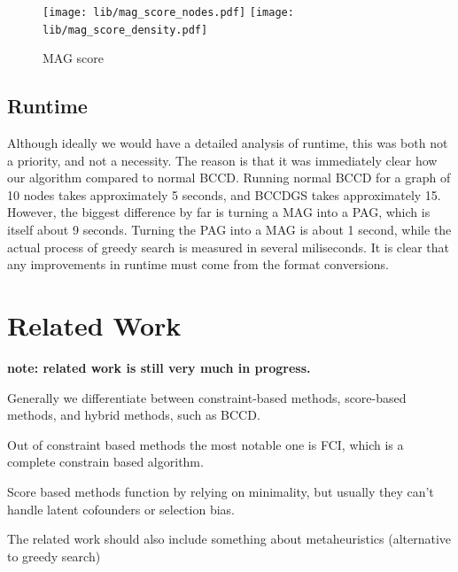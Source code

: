 \documentclass[11pt,a4paper]{report}
\theoremstyle{definition}
\begin{document}
\begin{figure}
  \centering
  \texttt{[image: lib/mag\_score\_nodes.pdf]}
  \texttt{[image: lib/mag\_score\_density.pdf]}
  \caption{MAG score}
  \label{fig:mag_score}
\end{figure}

\section{Runtime}\label{runtime}
Although ideally we would have a detailed analysis of runtime, this was
both not a priority, and not a necessity. The reason is that it was
immediately clear how our algorithm compared to normal BCCD. Running
normal BCCD for a graph of 10 nodes takes approximately 5 seconds, and
BCCDGS takes approximately 15. However, the biggest difference by far is
turning a MAG into a PAG, which is itself about 9 seconds. Turning the PAG
into a MAG is about 1 second, while the actual process of greedy search is
measured in several miliseconds. It is clear that any improvements in
runtime must come from the format conversions.

\chapter{Related Work}\label{relatedwork}

\textbf{note: related work is still very much in progress.}

Generally we differentiate between constraint-based methods, score-based
methods, and hybrid methods, such as BCCD.

Out of constraint based methods the most notable one is
FCI\cite{spirtesCausationPredictionSearch2000}, which is a complete
\cite{zhangCompletenessOrientationRules2008} constrain based algorithm.

Score based methods function by relying on minimality, but
usually they can't handle latent cofounders or selection bias.

The related work should also include something about metaheuristics
(alternative to greedy search)


\end{document}
